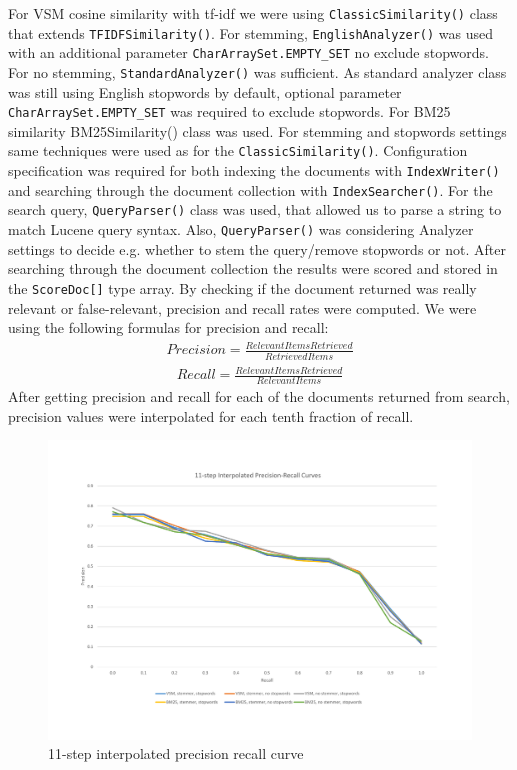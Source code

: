 \documentclass[parskip=full]{aaltoseries}
\providecommand{\inlinecode}[1]{\texttt{#1}}
\begin{document}
For VSM cosine similarity with tf-idf we were using \inlinecode{ClassicSimilarity()} class that extends \inlinecode{TFIDFSimilarity()}. For stemming, \inlinecode{EnglishAnalyzer()} was used with an additional parameter \inlinecode{CharArraySet.EMPTY\_SET} no exclude stopwords. For no stemming, \inlinecode{StandardAnalyzer()} was sufficient. As standard analyzer class was still using English stopwords by default, optional parameter \inlinecode{CharArraySet.EMPTY\_SET} was required to exclude stopwords. For BM25 similarity BM25Similarity() class was used. For stemming and stopwords settings  same techniques were used as for the \newline \inlinecode{ClassicSimilarity()}. Configuration specification was required for both indexing the documents with \inlinecode{IndexWriter()} and searching through the document collection with \inlinecode{IndexSearcher()}. For the search query, \inlinecode{QueryParser()} class was used, that allowed us to parse a string to match Lucene query syntax. Also, \inlinecode{QueryParser()} was considering Analyzer settings to decide e.g. whether to stem the query/remove stopwords or not. 
After searching through the document collection the results were scored and stored in the \inlinecode{ScoreDoc[]} type array. By checking if the document returned was really relevant or false-relevant, precision and recall rates were computed. We were using the following formulas for precision and recall: 
\begin{align*}
Precision = \frac{RelevantItemsRetrieved}{RetrievedItems}
\end{align*} 
\begin{align*}
Recall = \frac{RelevantItemsRetrieved}{RelevantItems}
\end{align*} 
After getting precision and recall for each of the documents returned from search, precision values were interpolated for each tenth fraction of recall. 

\begin{figure}[!ht]
\caption{11-step interpolated precision recall curve}
\includegraphics[scale=0.40]{curves.pdf}
\end{figure}
\end{document}
